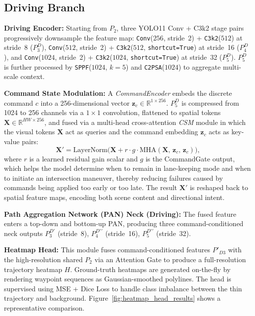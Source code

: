 \subsection{Driving Branch}

\textbf{Driving Encoder:}
Starting from $P_2$, three YOLO11 Conv + C3k2 stage pairs
progressively downsample the feature map:
\texttt{Conv}($256$, stride~2) + \texttt{C3k2}($512$) at stride~8
($P_3^D$),
\texttt{Conv}($512$, stride~2) + \texttt{C3k2}($512$,
\texttt{shortcut=True}) at stride~16 ($P_4^D$), and
\texttt{Conv}($1024$, stride~2) + \texttt{C3k2}($1024$,
\texttt{shortcut=True}) at stride~32 ($P_5^D$).
$P_5^D$ is further processed by \texttt{SPPF}($1024$, $k{=}5$) and
\texttt{C2PSA}($1024$) to aggregate multi-scale context.

\textbf{Command State Modulation:}
A \emph{CommandEncoder} embeds the discrete command $c$
into a 256-dimensional vector $\mathbf{z}_c \in \mathbb{R}^{1\times 256}$.
$P_5^D$ is compressed from 1024 to 256 channels via a $1{\times}1$
convolution, flattened to spatial tokens
$\mathbf{X} \in \mathbb{R}^{HW\times 256}$, and fused via a
multi-head cross-attention \emph{CSM} module in which the
visual tokens $\mathbf{X}$ act as queries and the command embedding
$\mathbf{z}_c$ acts as key-value pairs:
\begin{equation}
  \mathbf{X}' = \mathrm{LayerNorm}\!\bigl(
    \mathbf{X} + r \cdot g \cdot
    \mathrm{MHA}(\mathbf{X},\,\mathbf{z}_c,\,\mathbf{z}_c)
  \bigr),
  \label{eq:ccfusion}
\end{equation}
where $r$ is a learned residual gain scalar and $g$ is the
CommandGate output, which helps the model determine when to remain
in lane-keeping mode and when to initiate an intersection maneuver,
thereby reducing failures caused by commands being applied too early
or too late.
The result $\mathbf{X}'$ is reshaped back to spatial feature maps,
encoding both scene content and directional intent.

\textbf{Path Aggregation Network (PAN) Neck (Driving):}
The fused feature enters a top-down and bottom-up PAN,
producing three command-conditioned neck outputs
$P_3^{D\prime}$ (stride~8), $P_4^{D\prime\prime}$ (stride~16),
$P_5^{D\prime\prime}$ (stride~32).

\textbf{Heatmap Head:}
This module fuses command-conditioned features $P'_{D3}$
  with the high-resolution shared $P_2$ via an Attention Gate to
  produce a full-resolution trajectory heatmap $H$. Ground-truth
  heatmaps are generated on-the-fly by rendering waypoint sequences
  as Gaussian-smoothed polylines. The head is supervised using
  MSE + Dice Loss to handle class imbalance between the thin
  trajectory and background.
  Figure~\ref{fig:heatmap_head_results} shows a representative
  comparison.

